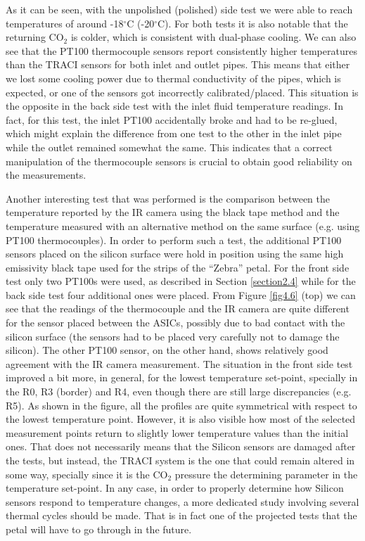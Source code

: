 		As it can be seen, with the unpolished (polished) side test we were able to reach temperatures of around -18$^{\circ}$C (-20$^{\circ}$C). For both tests it is also notable that the returning CO$_{2}$ is colder, which is consistent with dual-phase cooling. We can also see that the PT100 thermocouple sensors report consistently higher temperatures than the TRACI sensors for both inlet and outlet pipes. This means that either we lost some cooling power due to thermal conductivity of the pipes, which is expected, or one of the sensors got incorrectly calibrated/placed. This situation is the opposite in the back side test with the inlet fluid temperature readings. In fact, for this test, the inlet PT100 accidentally broke and had to be re-glued, which might explain the difference from one test to the other in the inlet pipe while the outlet remained somewhat the same. This indicates that a correct manipulation of the thermocouple sensors is crucial to obtain good reliability on the measurements.
		
		Another interesting test that was performed is the comparison between the temperature reported by the IR camera using the black tape method and the temperature measured with an alternative method on the same surface (e.g. using PT100 thermocouples). In order to perform such a test, the additional PT100 sensors placed on the silicon surface were hold in position using the same high emissivity black tape used for the strips of the “Zebra” petal. For the front side test only two PT100s were used, as described in Section \ref{section2.4} while for the back side test four additional ones were placed. From Figure \ref{fig4.6} (top) we can see that the readings of the thermocouple and the IR camera are quite different for the sensor placed between the ASICs, possibly due to bad contact with the silicon surface (the sensors had to be placed very carefully not to damage the silicon). The other PT100 sensor, on the other hand, shows relatively good agreement with the IR camera measurement. The situation in the front side test improved a bit more, in general, for the lowest temperature set-point, specially in the R0, R3 (border) and R4, even though there are still large discrepancies (e.g. R5). As shown in the figure, all the profiles are quite symmetrical with respect to the lowest temperature point. However, it is also visible how most of the selected measurement points return to slightly lower temperature values than the initial ones. That does not necessarily means that the Silicon sensors are damaged after the tests, but instead, the TRACI system is the one that could remain altered in some way, specially since it is the CO$_{2}$ pressure the determining parameter in the temperature set-point.
		In any case, in order to properly determine how Silicon sensors respond to temperature changes, a more dedicated study involving several thermal cycles should be made. That is in fact one of the projected tests that the petal will have to go through in the future.\bigskip	

